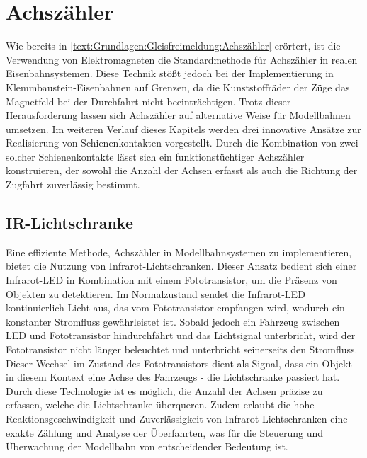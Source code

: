 \section{Achszähler}\label{text:Methodik:Achszähler}

Wie bereits in \autoref{text:Grundlagen:Gleisfreimeldung:Achszähler} erörtert, ist die Verwendung von Elektromagneten die Standardmethode für Achszähler in realen Eisenbahnsystemen. Diese Technik stößt jedoch bei der Implementierung in Klemmbaustein-Eisenbahnen auf Grenzen, da die Kunststoffräder der Züge das Magnetfeld bei der Durchfahrt nicht beeinträchtigen. Trotz dieser Herausforderung lassen sich Achszähler auf alternative Weise für Modellbahnen umsetzen.
\newline
Im weiteren Verlauf dieses Kapitels werden drei innovative Ansätze zur Realisierung von Schienenkontakten vorgestellt. Durch die Kombination von zwei solcher Schienenkontakte lässt sich ein funktionstüchtiger Achszähler konstruieren, der sowohl die Anzahl der Achsen erfasst als auch die Richtung der Zugfahrt zuverlässig bestimmt.

\subsection{IR-Lichtschranke}\label{text:Methodik:Achszähler:Lichtschranke}

Eine effiziente Methode, Achszähler in Modellbahnsystemen zu implementieren, bietet die Nutzung von Infrarot-Lichtschranken. Dieser Ansatz bedient sich einer Infrarot-LED in Kombination mit einem Fototransistor, um die Präsenz von Objekten zu detektieren. Im Normalzustand sendet die Infrarot-LED kontinuierlich Licht aus, das vom Fototransistor empfangen wird, wodurch ein konstanter Stromfluss gewährleistet ist. Sobald jedoch ein Fahrzeug zwischen LED und Fototransistor hindurchfährt und das Lichtsignal unterbricht, wird der Fototransistor nicht länger beleuchtet und unterbricht seinerseits den Stromfluss. Dieser Wechsel im Zustand des Fototransistors dient als Signal, dass ein Objekt - in diesem Kontext eine Achse des Fahrzeugs - die Lichtschranke passiert hat.
\newline
Durch diese Technologie ist es möglich, die Anzahl der Achsen präzise zu erfassen, welche die Lichtschranke überqueren. Zudem erlaubt die hohe Reaktionsgeschwindigkeit und Zuverlässigkeit von Infrarot-Lichtschranken eine exakte Zählung und Analyse der Überfahrten, was für die Steuerung und Überwachung der Modellbahn von entscheidender Bedeutung ist. 

